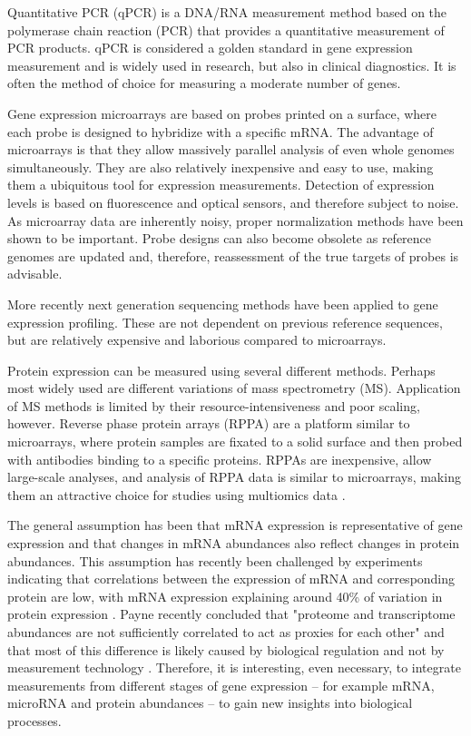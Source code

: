 Quantitative PCR (qPCR) is a DNA/RNA measurement method based on the
polymerase chain reaction (PCR) that provides a quantitative measurement of
PCR products. qPCR is considered a golden standard in gene expression
measurement and is widely used in research, but also in clinical diagnostics.
It is often the method of choice for measuring a moderate number of genes. \citep{VanGuilder2008}

Gene expression microarrays are based on probes printed on a
surface, where each probe is designed to hybridize with a specific mRNA.
The advantage of microarrays is that they allow massively
parallel analysis of even whole genomes simultaneously. They are also relatively inexpensive and
easy to use, making them a ubiquitous tool for expression measurements. Detection
of expression levels is based on fluorescence and optical sensors, and
therefore subject to noise. As microarray data are inherently noisy, proper
normalization methods have been shown to be important. Probe designs can also
become obsolete as reference genomes are updated and, therefore, reassessment
of the true targets of probes is advisable. \citep{Allison2006}

More recently next generation sequencing methods have been applied to gene
expression profiling. These are not dependent on previous reference sequences,
but are relatively expensive and laborious compared to microarrays.

Protein expression can be measured using several different methods. Perhaps most widely
used are different variations of mass spectrometry (MS). Application of MS methods is
limited by their resource-intensiveness and poor scaling, however. Reverse phase protein
arrays (RPPA) are a platform similar to microarrays, where protein samples are fixated
to a solid surface and then probed with antibodies binding to a specific proteins.
RPPAs are inexpensive, allow large-scale analyses, and analysis of RPPA data is
similar to microarrays, making them an attractive choice for studies
using multiomics data \citep{Mannsperger2010}.

The general assumption has been that mRNA expression is representative of gene
expression and that changes in mRNA abundances also reflect changes in protein
abundances. This assumption has recently been challenged by experiments
indicating that correlations between the expression of mRNA and corresponding
protein are low, with mRNA expression explaining around 40\% of variation in
protein expression \citep{Vogel2012}.
Payne recently concluded that "proteome and transcriptome
abundances are not sufficiently correlated to act as proxies for each other"
and that most of this difference is likely caused by biological regulation and
not by measurement technology \cite{Payne2015}.
Therefore, it is interesting, even necessary, to integrate measurements from
different stages of gene expression -- for example mRNA, microRNA and protein
abundances -- to gain new insights into biological processes.



